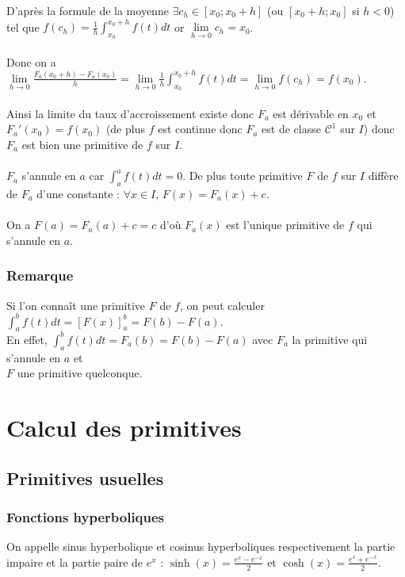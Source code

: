 \documentclass[a4paper,10pt]{book} %
\begin{document}
D'après la formule de la moyenne $\exists c_h\in [x_0;x_0+h]$ (ou $[x_0+h;x_0]$ si $h<0$)\\
tel que $f(c_h)=\frac{1}{h}\displaystyle\int_{x_0}^{x_0+h}f(t)dt$ or $\lim\limits_{h\rightarrow 0}c_h=x_0$.\\\\

Donc on a $\lim\limits_{h\rightarrow 0} \frac{F_a(x_0+h)-F_a(x_0)}{h}=\lim\limits_{h\rightarrow 0}\frac{1}{h}\displaystyle\int_{x_0}^{x_0+h}f(t)dt=\lim\limits_{h\rightarrow 0}f(c_h)=f(x_0)$.\\\\

Ainsi la limite du taux d'accroissement existe donc $F_a$ est dérivable en $x_0$ et $F_a'(x_0)=f(x_0)$
(de plus $f$ est continue donc $F_a$ est de classe $\mathcal{C}^1$ sur $I$) donc $F_a$ est bien une primitive de $f$ sur $I$.\\\\

$F_a$ s'annule en $a$ car $\displaystyle\int_{a}^{a}f(t)dt=0$. De plus toute primitive $F$ de $f$ sur $I$ diffère de $F_a$ d'une constante : $\forall x\in I$, $F(x)=F_a(x)+c$.\\\\

On a $F(a)=F_a(a)+c=c$ d'où $F_a(x)$ est l'unique primitive de $f$ qui s'annule en $a$.

\subsubsection{Remarque}
Si l'on connaît une primitive $F$ de $f$, on peut calculer $\displaystyle\int_a^b f(t)dt=[F(x)]_a^b=F(b)-F(a)$.\\

En effet, $\displaystyle\int_a^bf(t)dt=F_a(b)=F(b)-F(a)$ avec $F_a$ la primitive qui s'annule en $a$ et\\
$F$ une primitive quelconque.

\newpage

\section{Calcul des primitives}
\subsection{Primitives usuelles}
\subsubsection{Fonctions hyperboliques}
On appelle sinus hyperbolique et cosinus hyperboliques respectivement la partie impaire et la partie paire de $e^x$ : $\sinh(x)=\frac{e^x-e^{-x}}{2}$ et $\cosh(x)=\frac{e^x+e^{-x}}{2}$.\\
\end{document}
